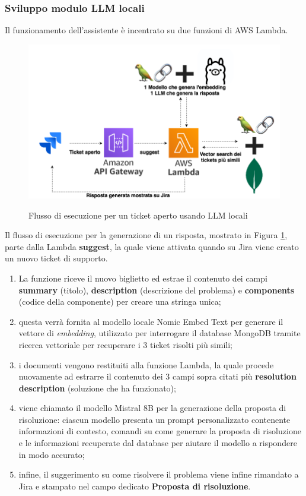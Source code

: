 \newpage
\subsubsection*{Sviluppo modulo LLM locali}

Il funzionamento dell'assistente è incentrato su due funzioni di AWS Lambda.

\begin{figure}[H]
    \centering
    \includegraphics[alt={Flusso di esecuzione per la generazione di una risposta}, width=1\columnwidth]{img/ticketCreatoLocale.png}
    \caption{Flusso di esecuzione per un ticket aperto usando LLM locali}
    \label{fig:flow_chart_new_ticket}
\end{figure}

Il flusso di esecuzione per la generazione di un risposta, mostrato in Figura \ref{fig:flow_chart_new_ticket}, parte dalla Lambda \textbf{suggest}, la quale viene attivata quando su Jira viene creato un nuovo ticket di supporto.
\begin{enumerate}
    \item La funzione riceve il nuovo biglietto ed estrae il contenuto dei campi \textbf{summary} (titolo), \textbf{description} (descrizione del problema) e \textbf{components} (codice della componente) per creare una stringa unica; 
    \item questa verrà fornita al modello locale Nomic Embed Text per generare il vettore di \textit{embedding}, utilizzato per interrogare il database MongoDB tramite ricerca vettoriale per recuperare i 3 ticket risolti più simili;
    \item i documenti vengono restituiti alla funzione Lambda, la quale procede nuovamente ad estrarre il contenuto dei 3 campi sopra citati più \textbf{resolution description} (soluzione che ha funzionato);
    \item viene chiamato il modello Mistral 8B per la generazione della proposta di risoluzione: ciascun modello presenta un prompt personalizzato contenente informazioni di contesto, comandi su come generare la proposta di risoluzione e le informazioni recuperate dal database per aiutare il modello a rispondere in modo accurato;
    \item infine, il suggerimento su come risolvere il problema viene infine rimandato a Jira e stampato nel campo dedicato \textbf{Proposta di risoluzione}.
\end{enumerate}


